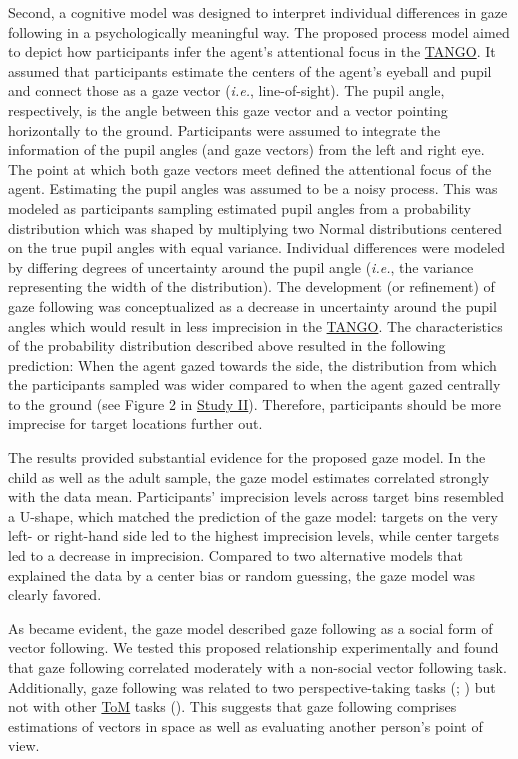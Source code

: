\documentclass[
]{scrbook}
\begin{document}
Second, a cognitive model was designed to interpret individual differences in gaze following in a psychologically meaningful way. The proposed process model aimed to depict how participants infer the agent's attentional focus in the \hyperref[acronyms_TANGO]{TANGO}. It assumed that participants estimate the centers of the agent's eyeball and pupil and connect those as a gaze vector (\emph{i.e.}, line-of-sight). The pupil angle, respectively, is the angle between this gaze vector and a vector pointing horizontally to the ground. Participants were assumed to integrate the information of the pupil angles (and gaze vectors) from the left and right eye. The point at which both gaze vectors meet defined the attentional focus of the agent. Estimating the pupil angles was assumed to be a noisy process. This was modeled as participants sampling estimated pupil angles from a probability distribution which was shaped by multiplying two Normal distributions centered on the true pupil angles with equal variance. Individual differences were modeled by differing degrees of uncertainty around the pupil angle (\emph{i.e.}, the variance representing the width of the distribution). The development (or refinement) of gaze following was conceptualized as a decrease in uncertainty around the pupil angles which would result in less imprecision in the \hyperref[acronyms_TANGO]{TANGO}. The characteristics of the probability distribution described above resulted in the following prediction: When the agent gazed towards the side, the distribution from which the participants sampled was wider compared to when the agent gazed centrally to the ground (see Figure 2 in \hyperref[studyII]{Study II}). Therefore, participants should be more imprecise for target locations further out.

The results provided substantial evidence for the proposed gaze model. In the child as well as the adult sample, the gaze model estimates correlated strongly with the data mean. Participants' imprecision levels across target bins resembled a U-shape, which matched the prediction of the gaze model: targets on the very left- or right-hand side led to the highest imprecision levels, while center targets led to a decrease in imprecision. Compared to two alternative models that explained the data by a center bias or random guessing, the gaze model was clearly favored.

As became evident, the gaze model described gaze following as a social form of vector following. We tested this proposed relationship experimentally and found that gaze following correlated moderately with a non-social vector following task. Additionally, gaze following was related to two perspective-taking tasks (; ) but not with other \hyperref[acronyms_ToM]{ToM} tasks (). This suggests that gaze following comprises estimations of vectors in space as well as evaluating another person's point of view.
\end{document}
